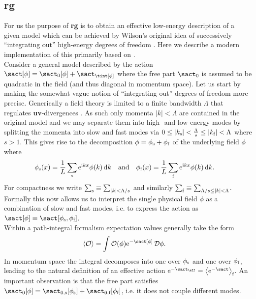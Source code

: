 \documentclass[english, parskip=full]{scrartcl}
\renewcommand{\gls}[1]{\textbf{#1}}
\newcommand{\tpspace}{momentum space}
\begin{document}
\subsection{\tMs{} \gls{rg}}\label{sec:rg:momentum_shell_rg}
For us the purpose of \gls{rg} is to obtain an effective low-energy description of a given model which can be achieved by Wilson's original idea of successively ``integrating out'' high-energy degrees of freedom \cite{Bosonization_Shankar_1994,RG_NonPerturbative_Introduction_Delamotte_2012}.
Here we describe a modern implementation of this primarily based on \cites[]{AltlandSimons}[]{Fradkin_2013}.\\
Consider a general model described by the action $\sact[\phi] = \sact_0[\phi] + \sact_\tint[\phi]$ where the free part $\sact_0$ is assumed to be quadratic in the field (and thus diagonal in \tpspace{}).
Let us start by making the somewhat vague notion of ``integrating out'' degrees of freedom more precise.
Generically a field theory is limited to a finite bandwidth $\Lambda$ that regulates \gls{uv}-divergences \cite{QFT_RG_OPE_Collins_1984}.
As such only momenta $|k|<\Lambda$ are contained in the original model and we may separate them into high- and low-energy modes by splitting the momenta into slow and fast modes via $0 \le |k_{\text{s}}| < \frac{\Lambda}{s} \le |k_{\text{f}}| < \Lambda$ where $s>1$.
This gives rise to the decomposition $\phi = \phi_{\text{s}} + \phi_{\text{f}}$ of the underlying field $\phi$ where
\begin{align*}
\phi_{\text{s}}(x) &= \frac{1}{L} \sum_{\text{s}} \text{e}^{\text{i} kx} \phi(k)\,\text{d} k \quad \text{and} \quad \phi_{\text{f}}(x) = \frac{1}{L} \sum_{\text{f}} \text{e}^{\text{i} kx} \phi(k)\,\text{d} k.
\end{align*}
For compactness we write $\sum_{\text{s}} \equiv \sum_{|k|<\Lambda/s}$ and similarly $\sum_{\text{f}} \equiv \sum_{\Lambda/s \le |k| < \Lambda}$.
Formally this now allows us to interpret the single physical field $\phi$ as a combination of slow and fast modes, i.e. to express the action as $\sact[\phi] \equiv \sact[\phi_\s, \phi_\f]$.\\
Within a path-integral formalism expectation values generally take the form \cite{AltlandSimons}
\begin{align*}
\bra*{\mathcal{O}} &= \int \mathcal{O(\phi) \powe{-\sact[\phi]}}\,\mathcal{D}\phi.
\end{align*}
In \tpspace{} the integral decomposes into one over $\phi_{\text{s}}$ and one over $\phi_{\text{f}}$, leading to the natural definition of an effective action $\powe{-\sact_\eff} = \bra*{\powe{-\sact}}_\f$.
An important observation is that the free part satisfies $\sact_0[\phi] = \sact_{0,\s}[\phi_\s] + \sact_{0,\f}[\phi_\f]$, i.e. it does not couple different modes.
\end{document}
